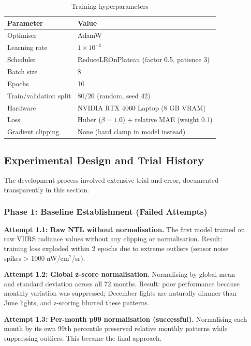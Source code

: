 \documentclass[12pt,a4paper]{article}
\begin{document}
\begin{table}[H]
\centering
\caption{Training hyperparameters}
\label{tab:hyperparams}
\begin{tabular}{@{}ll@{}}
\toprule
\textbf{Parameter} & \textbf{Value} \\
\midrule
Optimiser & AdamW \\
Learning rate & $1 \times 10^{-3}$ \\
Scheduler & ReduceLROnPlateau (factor 0.5, patience 3) \\
Batch size & 8 \\
Epochs & 10 \\
Train/validation split & 80/20 (random, seed 42) \\
Hardware & NVIDIA RTX 4060 Laptop (8 GB VRAM) \\
Loss & Huber ($\beta = 1.0$) + relative MAE (weight 0.1) \\
Gradient clipping & None (hard clamp in model instead) \\
\bottomrule
\end{tabular}
\end{table}

\subsection{Experimental Design and Trial History}
\label{subsec:experiments}

The development process involved extensive trial and error, documented transparently in this section.

\subsubsection{Phase 1: Baseline Establishment (Failed Attempts)}

\textbf{Attempt 1.1: Raw NTL without normalisation.} The first model trained on raw VIIRS radiance values without any clipping or normalisation. Result: training loss exploded within 2 epochs due to extreme outliers (sensor noise spikes > 1000 nW/cm$^2$/sr).

\textbf{Attempt 1.2: Global z-score normalisation.} Normalising by global mean and standard deviation across all 72 months. Result: poor performance because monthly variation was suppressed; December lights are naturally dimmer than June lights, and z-scoring blurred these patterns.

\textbf{Attempt 1.3: Per-month p99 normalisation (successful).} Normalising each month by its own 99th percentile preserved relative monthly patterns while suppressing outliers. This became the final approach.
\end{document}
